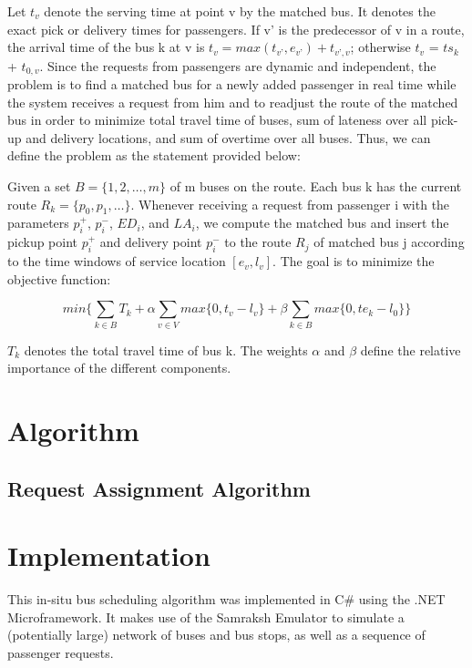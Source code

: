 \documentclass[runningheads]{llncs}
\begin{document}
Let $t_v$ denote the serving time at point v by the matched bus. It denotes the exact pick or delivery times for passengers. If v’ is the predecessor of v in a route, the arrival time of the bus k at v is $t_v = max(t_{v’}, e_{v’}) + t_{v’, v}$; otherwise $t_v$ = $ts_k$ + $t_{0, v}$.
Since the requests from passengers are dynamic and independent, the problem is to find a matched bus for a newly added passenger in real time while the system receives a request from him and to readjust the route of the matched bus in order to minimize total travel time of buses, sum of lateness over all pick-up and delivery locations, and sum of overtime over all buses. Thus, we can define the problem as the statement provided below:

Given a set $B = \{1, 2, …, m\}$ of m buses on the route. Each bus k has the current route $R_k = \{p_0, p_1, …\}$. Whenever receiving a request from passenger i with the parameters $p_i^+$, $p_i^-$, $ED_i$, and $LA_i$, we compute the matched bus and insert the pickup point $p_i^+$ and delivery point $p_i^-$ to the route $R_j$ of matched bus j according to the time windows of service location $[e_v, l_v]$. The goal is to minimize the objective function:

\begin{equation}
min\{\sum_{k\in B}{T_k} + \alpha\sum_{v\in V}{max\{0, t_v - l_v\}} + \beta\sum_{k\in B}{max\{0, te_k - l_0\}} \}
\end{equation}

$T_k$ denotes the total travel time of bus k. The weights $\alpha$ and $\beta$ define the relative importance of the different components.

\section{Algorithm}
\subsection{Request Assignment Algorithm}

\section{Implementation}
This in-situ bus scheduling algorithm was implemented in C\# using the .NET Microframework. It makes use of the Samraksh Emulator to simulate a (potentially large) network of buses and bus stops, as well as a sequence of passenger requests.
\end{document}
